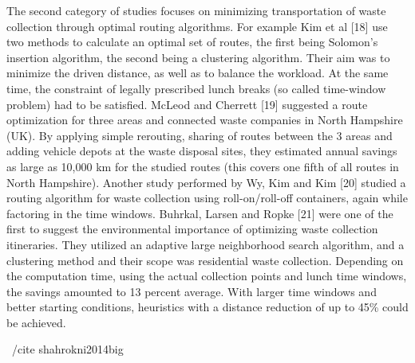 \documentclass[sigconf]{acmart}
\begin{document}

The second category of studies focuses on minimizing transportation of waste collection through optimal routing algorithms. For example Kim et al [18] use two methods to calculate an optimal set of routes, the first being Solomon's insertion algorithm, the second being a clustering algorithm. Their aim was to minimize the driven distance, as well as to balance the workload. At the same time, the constraint of legally prescribed lunch breaks (so called time-window problem) had to be satisfied. McLeod and Cherrett [19] suggested a route optimization for three areas and connected waste companies in North Hampshire (UK). By applying simple rerouting, sharing of routes between the 3 areas and adding vehicle depots at the waste disposal sites, they estimated annual savings as large as 10,000 km for the studied routes (this covers one fifth of all routes in North Hampshire). Another study performed by Wy, Kim and Kim [20] studied a routing algorithm for waste collection using roll-on/roll-off containers, again while factoring in the time windows. Buhrkal, Larsen and Ropke [21] were one of the ﬁrst to suggest the environmental importance of optimizing waste collection itineraries. They utilized an adaptive large neighborhood search algorithm, and a clustering method and their scope was residential waste collection. Depending on the computation time, using the actual collection points and lunch time windows, the savings amounted to 13 percent average. With larger time windows and better starting conditions, heuristics with a distance reduction of up to 45\% could be achieved.

~/cite {shahrokni2014big}
\end{document}
